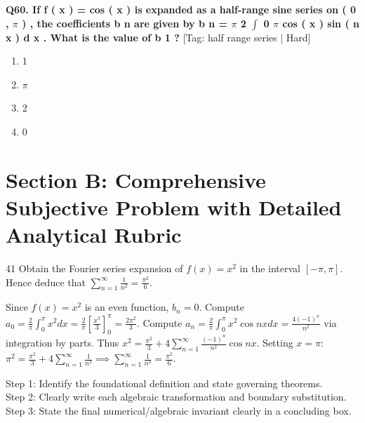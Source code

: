 \noindent\textbf{Q60. If f ( x ) = cos ( x ) is expanded as a half-range sine series on ( 0 , $\pi$ ) , the coefficients b n are given by b n = $\pi$ 2 $\int$ 0 $\pi$ cos ( x ) sin ( n x ) d x . What is the value of b 1 ?} \hfill [Tag: half range series | Hard]
\begin{enumerate}[label=(\alph*),topsep=2pt,itemsep=1pt,partopsep=0pt,parsep=0pt]
    \item {{1}}
    \item {{$\pi$}}
    \item {{2}}
    \item {{0}}
\end{enumerate}
\vspace{2mm}


\section{Section B: Comprehensive Subjective Problem with Detailed Analytical Rubric}

\begin{subjectiveq}{4}{1}
Obtain the Fourier series expansion of $f(x) = x^2$ in the interval $[-\pi, \pi]$. Hence deduce that $\sum_{n=1}^\infty \frac{1}{n^2} = \frac{\pi^2}{6}$.
\end{subjectiveq}

\begin{solbox}
Since $f(x) = x^2$ is an even function, $b_n = 0$. Compute $a_0 = \frac{2}{\pi}\int_0^\pi x^2 dx = \frac{2}{\pi}\left[\frac{x^3}{3}\right]_0^\pi = \frac{2\pi^2}{3}$. Compute $a_n = \frac{2}{\pi}\int_0^\pi x^2 \cos nx dx = \frac{4(-1)^n}{n^2}$ via integration by parts. Thus $x^2 = \frac{\pi^2}{3} + 4\sum_{n=1}^\infty \frac{(-1)^n}{n^2} \cos nx$. Setting $x = \pi$: $\pi^2 = \frac{\pi^2}{3} + 4\sum_{n=1}^\infty \frac{1}{n^2} \implies \sum_{n=1}^\infty \frac{1}{n^2} = \frac{\pi^2}{6}$.
\end{solbox}

\begin{examinertip}
Step 1: Identify the foundational definition and state governing theorems.\\
Step 2: Clearly write each algebraic transformation and boundary substitution.\\
Step 3: State the final numerical/algebraic invariant clearly in a concluding box.
\end{examinertip}
